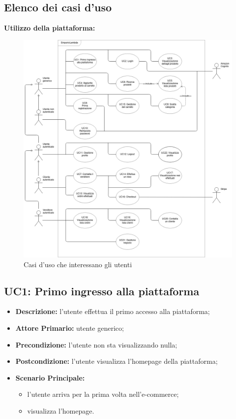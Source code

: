     \subsection{Elenco dei casi d'uso}
        \textbf{Utilizzo della piattaforma:}
        \begin{figure}[!ht]
            \caption{Casi d'uso che interessano gli utenti}
            \vspace{10px}
            \includegraphics[scale=0.44]{../../../Images/AnalisiRequisiti/casiUso}
            \centering
        \end{figure}
        \newpage
        \subsection{UC1: Primo ingresso alla piattaforma}
        \label{sec:UC1}
        \begin{itemize}
            \item \textbf{Descrizione:} l'utente effettua il primo accesso alla piattaforma;
            \item \textbf{Attore Primario:} utente generico;
            \item \textbf{Precondizione:} l'utente non sta visualizzando nulla;
            \item \textbf{Postcondizione:} l'utente visualizza l'homepage della piattaforma;
            \item \textbf{Scenario Principale:} 
            \begin{itemize}
                \item l'utente arriva per la prima volta nell'e-commerce;
                \item visualizza l'homepage.
            \end{itemize}
        \end{itemize}
